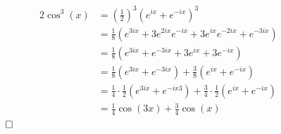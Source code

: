\documentclass[12pt]{article}
\begin{document}
	\begin{alignat*}{2}
	\cos^3(x) &= \left(\frac{1}{2}\right)^3 (e^{ix} + e^{-ix})^3\\
	&= \frac{1}{8} \left(e^{3ix}+3e^{2ix}e^{-ix} + 3e^{ix}e^{-2ix}+e^{-3ix}\right)\\
	&= \frac{1}{8} \left(e^{3ix}+e^{-3ix} + 3e^{ix} + 3e^{-ix}\right)\\
	&= \frac{1}{8} \left(e^{3ix}+e^{-3ix}\right) + \frac{3}{8}\left(e^{ix} + e^{-ix}\right)\\
	&= \frac{1}{4} \cdot \frac{1}{2} \left(e^{3ix}+e^{-ix3}\right) +  \frac{3}{4} \cdot \frac{1}{2}\left(e^{ix} + e^{-ix}\right)\\
	&= \frac{1}{4} \cos(3x) +  \frac{3}{4}  \cos(x) & 
	\end{alignat*} \hfill $ \qed$
	
\end{document}
